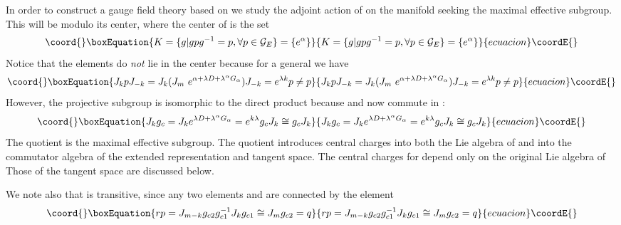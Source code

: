 \documentclass[a4paper,12pt]{article}
\begin{document}
In order to construct a gauge field theory based on \coordHE{} we
study the adjoint action of \coordHE{} on the manifold \coordHE{} seeking the maximal effective subgroup. This will be \coordHE{} modulo its center, where the center of \coordHE{} is
the set 
\begin{equation}\coord{}\boxEquation{
K=\{g|gpg^{-1}=p,\forall p\in \mathcal{G}_{E}\}=\{e^{\alpha }\}
}{
K=\{g|gpg^{-1}=p,\forall p\in \mathcal{G}_{E}\}=\{e^{\alpha }\}
}{ecuacion}\coordE{}\end{equation}
Notice that the elements \coordHE{} do \textit{not} lie in the center because
for a general \coordHE{} we have 
\begin{equation}\coord{}\boxEquation{
J_{k}pJ_{-k}=J_{k}(J_{m}\ e^{\alpha +\lambda D+\lambda ^{\alpha }G_{\alpha
}})J_{-k}=e^{\lambda k}p\neq p
}{
J_{k}pJ_{-k}=J_{k}(J_{m}\ e^{\alpha +\lambda D+\lambda ^{\alpha }G_{\alpha
}})J_{-k}=e^{\lambda k}p\neq p
}{ecuacion}\coordE{}\end{equation}
However, the projective subgroup \coordHE{} is isomorphic to the
direct product \coordHE{} because \coordHE{} and \coordHE{} 
\coordHE{} now commute in \coordHE{}: 
\begin{equation}\coord{}\boxEquation{
J_{k}g_{c}=J_{k}e^{\lambda D+\lambda ^{\alpha }G_{\alpha }}=e^{k\lambda
}g_{c}J_{k}\cong g_{c}J_{k}
}{
J_{k}g_{c}=J_{k}e^{\lambda D+\lambda ^{\alpha }G_{\alpha }}=e^{k\lambda
}g_{c}J_{k}\cong g_{c}J_{k}
}{ecuacion}\coordE{}\end{equation}
The quotient \coordHE{} is the maximal effective subgroup. The
quotient introduces central charges into both the Lie algebra of \coordHE{} and into the commutator algebra of the extended representation and
tangent space. The central charges for \coordHE{} depend only on
the original Lie algebra of \coordHE{} Those of the tangent space are
discussed below.

We note also that \coordHE{} is transitive, since any two elements \coordHE{} and \coordHE{} are connected by the element \coordHE{}%
\begin{equation}\coord{}\boxEquation{
rp=J_{m-k}g_{c2}g_{c1}^{-1}J_{k}g_{c1}\cong J_{m}g_{c2}=q
}{
rp=J_{m-k}g_{c2}g_{c1}^{-1}J_{k}g_{c1}\cong J_{m}g_{c2}=q
}{ecuacion}\coordE{}\end{equation}
\end{document}

